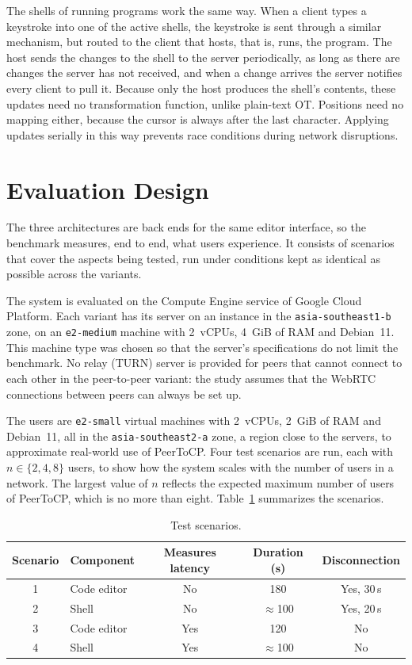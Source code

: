 The shells of running programs work the same way. When a client types a keystroke into one of the active shells, the keystroke is sent through a similar mechanism, but routed to the client that hosts, that is, runs, the program. The host sends the changes to the shell to the server periodically, as long as there are changes the server has not received, and when a change arrives the server notifies every client to pull it. Because only the host produces the shell's contents, these updates need no transformation function, unlike plain-text OT. Positions need no mapping either, because the cursor is always after the last character. Applying updates serially in this way prevents race conditions during network disruptions.

\section{Evaluation Design}
\label{sec:desain_evaluasi}

The three architectures are back ends for the same editor interface, so the benchmark measures, end to end, what users experience. It consists of scenarios that cover the aspects being tested, run under conditions kept as identical as possible across the variants.

The system is evaluated on the Compute Engine service of Google Cloud Platform. Each variant has its server on an instance in the \texttt{asia-southeast1-b} zone, on an \texttt{e2-medium} machine with 2~vCPUs, 4~GiB of RAM and Debian~11. This machine type was chosen so that the server's specifications do not limit the benchmark. No relay (TURN) server is provided for peers that cannot connect to each other in the peer-to-peer variant: the study assumes that the WebRTC connections between peers can always be set up.

The users are \texttt{e2-small} virtual machines with 2~vCPUs, 2~GiB of RAM and Debian~11, all in the \texttt{asia-southeast2-a} zone, a region close to the servers, to approximate real-world use of PeerToCP. Four test scenarios are run, each with $n \in \{2, 4, 8\}$ users, to show how the system scales with the number of users in a network. The largest value of $n$ reflects the expected maximum number of users of PeerToCP, which is no more than eight. Table~\ref{tab:skenarios} summarizes the scenarios.

\begin{table}[htbp]
\centering
\caption{Test scenarios.}
\label{tab:skenarios}
\begin{tabular}{@{}clccc@{}}
\toprule
\textbf{Scenario} & \textbf{Component} & \textbf{Measures latency} & \textbf{Duration (s)} & \textbf{Disconnection} \\
\midrule
1 & Code editor & No  & 180            & Yes, 30\,s \\
2 & Shell       & No  & $\approx$100   & Yes, 20\,s \\
3 & Code editor & Yes & 120            & No \\
4 & Shell       & Yes & $\approx$100   & No \\
\bottomrule
\end{tabular}
\end{table}

